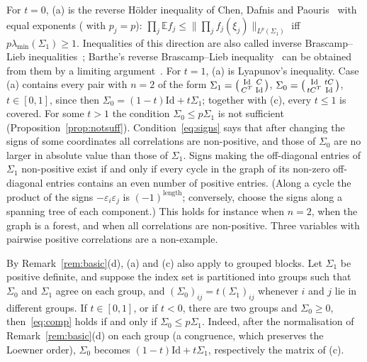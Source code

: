 \documentclass[11pt]{amsart}
\theoremstyle{definition}
\newcommand{\E}{\mathbb{E}}
\newcommand{\Id}{\mathrm{Id}}
\begin{document}
For $t=0$, (a) is the reverse H\"older inequality of Chen, Dafnis and Paouris~\cite{CDP15} with equal exponents
(\cite[Theorem~B]{IK25} with $p_j=p$): $\prod_j\E f_j\le\|\prod_jf_j(\xi_j)\|_{L^p(\Sigma_1)}$ iff
$p\lambda_{\min}(\Sigma_1)\ge1$. Inequalities of this direction are also called inverse Brascamp--Lieb
inequalities~\cite{BW22}; Barthe's reverse Brascamp--Lieb inequality~\cite{Bar98} can be obtained from them by a
limiting argument~\cite{IK25}. For $t=1$, (a) is Lyapunov's inequality. Case (a) contains every pair with $n=2$ of
the form $\Sigma_1=\begin{psmallmatrix}\Id&C\\C^T&\Id\end{psmallmatrix}$,
$\Sigma_0=\begin{psmallmatrix}\Id&tC\\tC^T&\Id\end{psmallmatrix}$, $t\in[0,1]$, since then $\Sigma_0=(1-t)\Id+t\Sigma_1$;
together with (c), every $t\le1$ is covered. For some $t>1$ the condition $\Sigma_0\le p\Sigma_1$ is not sufficient
(Proposition~\ref{prop:notsuff}). Condition~\eqref{eq:signs} says that after changing the signs of
some coordinates all correlations are non-positive, and those of $\Sigma_0$ are no larger in absolute value than
those of $\Sigma_1$. Signs making the off-diagonal entries of $\Sigma_1$ non-positive exist if and only if every
cycle in the graph of its non-zero off-diagonal entries contains an even number of positive entries. (Along a cycle
the product of the signs $-\varepsilon_i\varepsilon_j$ is $(-1)^{\text{length}}$; conversely, choose the signs along a
spanning tree of each component.) This holds for instance when $n=2$, when the graph is a forest, and when all
correlations are non-positive. Three variables with pairwise positive correlations are a non-example.

By Remark~\ref{rem:basic}(d), (a) and (c) also apply to grouped blocks. Let $\Sigma_1$ be positive definite, and
suppose the index set is partitioned into groups such that $\Sigma_0$ and $\Sigma_1$ agree on each group, and $(\Sigma_0)_{ij}=t(\Sigma_1)_{ij}$ whenever $i$ and
$j$ lie in different groups. If $t\in[0,1]$, or if $t<0$, there are two groups and $\Sigma_0\ge0$, then~\eqref{eq:comp} holds
if and only if $\Sigma_0\le p\Sigma_1$. Indeed, after the normalisation of Remark~\ref{rem:basic}(d) on each group
(a congruence, which preserves the Loewner order), $\Sigma_0$ becomes $(1-t)\Id+t\Sigma_1$, respectively the matrix of
(c).
\end{document}
